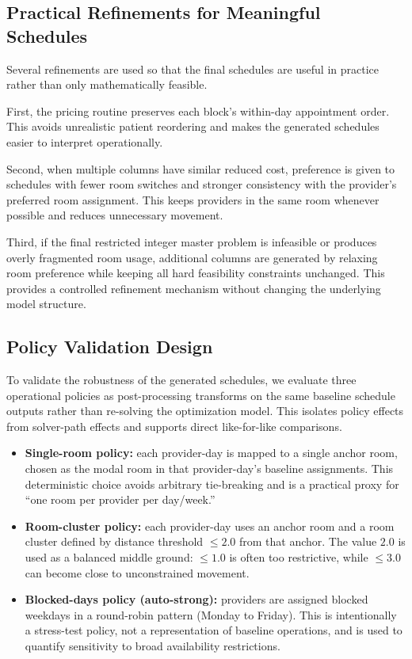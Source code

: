 \documentclass[12pt]{article}
\begin{document}
\subsection*{Practical Refinements for Meaningful Schedules}

Several refinements are used so that the final schedules are useful in practice rather than only
mathematically feasible.

First, the pricing routine preserves each block's within-day appointment order. This avoids
unrealistic patient reordering and makes the generated schedules easier to interpret operationally.

Second, when multiple columns have similar reduced cost, preference is given to schedules with
fewer room switches and stronger consistency with the provider's preferred room assignment.
This keeps providers in the same room whenever possible and reduces unnecessary movement.

Third, if the final restricted integer master problem is infeasible or produces overly fragmented
room usage, additional columns are generated by relaxing room preference while keeping all
hard feasibility constraints unchanged. This provides a controlled refinement mechanism without
changing the underlying model structure.

\subsection*{Policy Validation Design}

To validate the robustness of the generated schedules, we evaluate three operational policies as
post-processing transforms on the same baseline schedule outputs rather than re-solving the
optimization model. This isolates policy effects from solver-path effects and supports direct
like-for-like comparisons.

\begin{itemize}
  \item \textbf{Single-room policy:} each provider-day is mapped to a single anchor room, chosen
  as the modal room in that provider-day's baseline assignments. This deterministic choice avoids
  arbitrary tie-breaking and is a practical proxy for ``one room per provider per day/week.''
  \item \textbf{Room-cluster policy:} each provider-day uses an anchor room and a room cluster
  defined by distance threshold $\le 2.0$ from that anchor. The value $2.0$ is used as a balanced
  middle ground: $\le 1.0$ is often too restrictive, while $\le 3.0$ can become close to
  unconstrained movement.
  \item \textbf{Blocked-days policy (auto-strong):} providers are assigned blocked weekdays in a
  round-robin pattern (Monday to Friday). This is intentionally a stress-test policy, not a
  representation of baseline operations, and is used to quantify sensitivity to broad availability
  restrictions.

\end{itemize}
\end{document}
